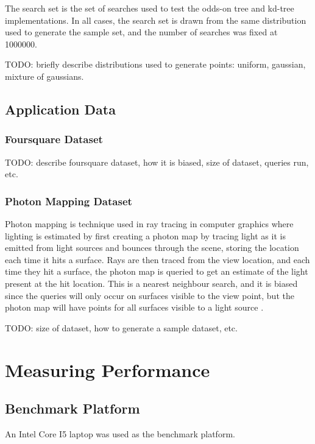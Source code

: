 \documentclass[mcs]{scsthesis}
\begin{document}
The search set is the set of searches used to  test the odds-on tree and
kd-tree implementations.  In all cases, the search set is drawn from the same
distribution used to generate the sample set, and the number of searches was
fixed at 1000000. 

TODO: briefly describe distributions used to generate points: uniform, gaussian,
mixture of gaussians.

\subsection{Application Data}

\subsubsection{Foursquare Dataset}

TODO: describe foursquare dataset, how it is biased, size of dataset, queries
run, etc.

\subsubsection{Photon Mapping Dataset}

Photon mapping is technique used in ray tracing in computer graphics
where lighting is estimated by first creating a photon map by tracing light as
it is emitted from light sources and bounces through the scene, storing the
location each time it hits a surface.  Rays are then traced from the view
location, and each time they hit a surface, the photon map is queried to get an
estimate of the light present at the hit location.  This is a nearest neighbour
search, and it is biased since the queries will only occur on surfaces visible
to the view point, but the photon map will have points for all surfaces visible
to a light source \cite{physicallybased}.

TODO: size of dataset, how to generate a sample dataset, etc.


\section{Measuring Performance}

\subsection{Benchmark Platform}

An Intel Core I5 laptop was used as the benchmark platform.
\end{document}
